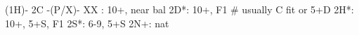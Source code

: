 (1H)- 2C -(P/X)- 
XX : 10+, near bal
2D*: 10+, F1  # usually C fit or 5+D
2H*: 10+, 5+S, F1
2S*: 6-9, 5+S
2N+: nat